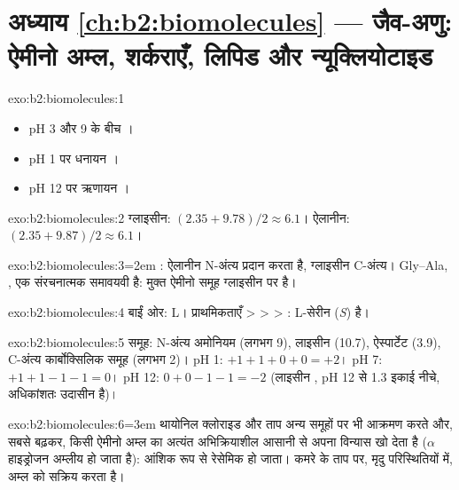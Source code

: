 \section*{अध्याय \ref{ch:b2:biomolecules} --- जैव-अणु: ऐमीनो अम्ल, शर्कराएँ, लिपिड और न्यूक्लियोटाइड}

\begin{solution}{exo:b2:biomolecules:1}
\begin{itemize}
  \item pH 3 और 9 के बीच  ।
  \item pH 1 पर धनायन ।
  \item pH 12 पर ऋणायन ।
\end{itemize}
\end{solution}

\begin{solution}{exo:b2:biomolecules:2}
ग्लाइसीन: $(2.35 + 9.78)/2 \approx 6.1$। ऐलानीन: $(2.35 + 9.87)/2 \approx 6.1$।
\end{solution}

\begin{solution}{exo:b2:biomolecules:3}\emergencystretch=2em
: ऐलानीन N-अंत्य प्रदान करता है, ग्लाइसीन C-अंत्य। Gly--Ala,
, एक संरचनात्मक समावयवी है: मुक्त ऐमीनो समूह ग्लाइसीन पर है।
\end{solution}

\begin{solution}{exo:b2:biomolecules:4}
 बाईं ओर: L। प्राथमिकताएँ  >  >  > : L-सेरीन
(\textit{S}) है।
\end{solution}

\begin{solution}{exo:b2:biomolecules:5}
समूह: N-अंत्य अमोनियम (लगभग 9), लाइसीन  (10.7), ऐस्पार्टेट  (3.9),
C-अंत्य कार्बोक्सिलिक समूह (लगभग 2)। pH 1: $+1 +1 + 0 + 0 = +2$। pH 7: $+1 +1 -1 -1 = 0$। pH 12:
$0 + 0 - 1 - 1 = -2$ (लाइसीन , pH 12 से 1.3 इकाई नीचे, अधिकांशतः उदासीन है)।
\end{solution}

\begin{solution}{exo:b2:biomolecules:6}\emergencystretch=3em
थायोनिल क्लोराइड और ताप अन्य समूहों पर भी आक्रमण करते और, सबसे बढ़कर, किसी ऐमीनो अम्ल का अत्यंत अभिक्रियाशील 
आसानी से अपना विन्यास खो देता है ($\alpha$ हाइड्रोजन अम्लीय हो जाता है): 
आंशिक रूप से रेसेमिक हो जाता।  कमरे के ताप पर, मृदु परिस्थितियों में, अम्ल को सक्रिय करता है।
\end{solution}

